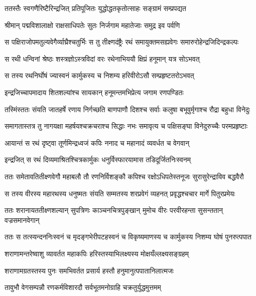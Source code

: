 \twolineshloka
{ततस्तैः स्वगणैरिष्टैरिन्द्रजित् प्रतिपूजितः}
{युद्धोद्धतकृतोत्साहः सङ्ग्रामं सम्प्रपद्यत} %

\twolineshloka
{श्रीमान् पद्मविशालाक्षो राक्षसाधिपतेः सुतः}
{निर्जगाम महातेजाः समुद्र इव पर्वणि} %

\twolineshloka
{स पक्षिराजोपमतुल्यवेगैर्व्याघ्रैश्चतुर्भिः स तु तीक्ष्णदंष्ट्रैः}
{रथं समायुक्तमसह्यवेगः समारुरोहेन्द्रजिदिन्द्रकल्पः} %

\twolineshloka
{स रथी धन्विनां श्रेष्ठः शस्त्रज्ञोऽस्त्रविदां वरः}
{रथेनाभिययौ क्षिप्रं हनूमान् यत्र सोऽभवत्} %

\twolineshloka
{स तस्य रथनिर्घोषं ज्यास्वनं कार्मुकस्य च}
{निशम्य हरिवीरोऽसौ सम्प्रहृष्टतरोऽभवत्} %

\twolineshloka
{इन्द्रजिच्चापमादाय शितशल्यांश्च सायकान्}
{हनूमन्तमभिप्रेत्य जगाम रणपण्डितः} %

\twolineshloka
{तस्मिंस्ततः संयति जातहर्षे रणाय निर्गच्छति बाणपाणौ}
{दिशश्च सर्वाः कलुषा बभूवुर्मृगाश्च रौद्रा बहुधा विनेदुः} %

\twolineshloka
{समागतास्तत्र तु नागयक्षा महर्षयश्चक्रचराश्च सिद्धाः}
{नभः समावृत्य च पक्षिसङ्घा विनेदुरुच्चैः परमप्रहृष्टाः} %

\twolineshloka
{आयान्तं स रथं दृष्ट्वा तूर्णमिन्द्रध्वजं कपिः}
{ननाद च महानादं व्यवर्धत च वेगवान्} %

\twolineshloka
{इन्द्रजित् स रथं दिव्यमाश्रितश्चित्रकार्मुकः}
{धनुर्विस्फारयामास तडिदूर्जितनिःस्वनम्} %

\twolineshloka
{ततः समेतावतितीक्ष्णवेगौ महाबलौ तौ रणनिर्विशङ्कौ}
{कपिश्च रक्षोऽधिपतेस्तनूजः सुरासुरेन्द्राविव बद्धवैरौ} %

\twolineshloka
{स तस्य वीरस्य महारथस्य धनुष्मतः संयति सम्मतस्य}
{शरप्रवेगं व्यहनत् प्रवृद्धश्चचार मार्गे पितुरप्रमेयः} %

\twolineshloka
{ततः शरानायततीक्ष्णशल्यान् सुपत्रिणः काञ्चनचित्रपुङ्खान्}
{मुमोच वीरः परवीरहन्ता सुसन्ततान् वज्रसमानवेगान्} %

\twolineshloka
{ततः स तत्स्यन्दननिःस्वनं च मृदङ्गभेरीपटहस्वनं च}
{विकृष्यमाणस्य च कार्मुकस्य निशम्य घोषं पुनरुत्पपात} %

\twolineshloka
{शराणामन्तरेष्वाशु व्यावर्तत महाकपिः}
{हरिस्तस्याभिलक्ष्यस्य मोक्षयँल्लक्ष्यसङ्ग्रहम्} %

\twolineshloka
{शराणामग्रतस्तस्य पुनः समभिवर्तत}
{प्रसार्य हस्तौ हनुमानुत्पपातानिलात्मजः} %

\twolineshloka
{तावुभौ वेगसम्पन्नौ रणकर्मविशारदौ}
{सर्वभूतमनोग्राहि चक्रतुर्युद्धमुत्तमम्} %

